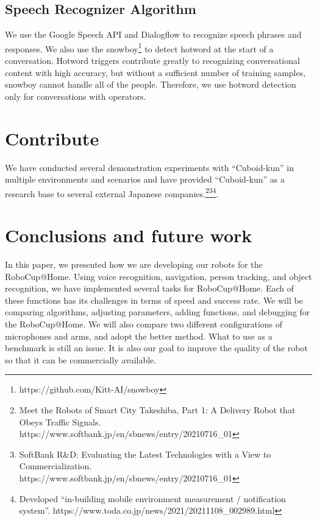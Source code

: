 \documentclass[runningheads,a4paper]{llncs}
\begin{document}
\subsection{Speech Recognizer Algorithm}
We use the Google Speech API and Dialogflow to recognize speech phrases and responses.
We also use the snowboy\footnote{https://github.com/Kitt-AI/snowboy} to detect hotword at the start of a conversation.
Hotword triggers contribute greatly to recognizing conversational content with high accuracy, but without a sufficient number of training samples, snowboy cannot handle all of the people.
Therefore, we use hotword detection only for conversations with operators.

\section{Contribute}
We have conducted several demonstration experiments with ``Cuboid-kun'' in multiple environments and scenarios and have provided ``Cuboid-kun'' as a research base to several external Japanese companies.\footnote{Meet the Robots of Smart City Takeshiba, Part 1: A Delivery Robot that Obeys Traffic Signals. https://www.softbank.jp/en/sbnews/entry/20210716\_01}\footnote{SoftBank R\&D: Evaluating the Latest Technologies with a View to Commercialization. https://www.softbank.jp/en/sbnews/entry/20210716\_01}\footnote{Developed ``in-building mobile environment measurement / notification system''. https://www.toda.co.jp/news/2021/20211108\_002989.html}.

\section{Conclusions and future work}
In this paper, we presented how we are developing our robots for the RoboCup@Home. Using voice recognition, navigation, person tracking, and object recognition, we have implemented several tasks for RoboCup@Home. Each of these functions has its challenges in terms of speed and success rate. We will be comparing algorithms, adjusting parameters, adding functions, and debugging for the RoboCup@Home. We will also compare two different configurations of microphones and arms, and adopt the better method. What to use as a benchmark is still an issue. It is also our goal to improve the quality of the robot so that it can be commercially available.

%
%




%
%

\robospecs


\nocite{*}
\end{document}
